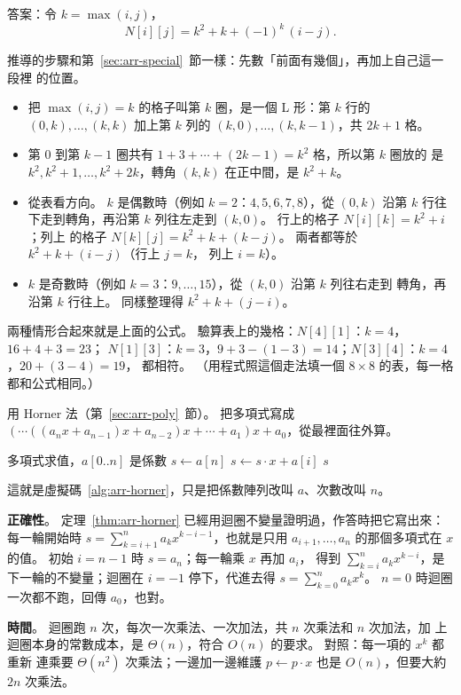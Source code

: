 答案：令 $k = \max(i, j)$，
\[
N[i][j] = k^2 + k + (-1)^k\,(i - j) .
\]

推導的步驟和第~\ref{sec:arr-special}~節一樣：先數「前面有幾個」，再加上自己這一段裡
的位置。
\begin{itemize}
\item 把 $\max(i, j) = k$ 的格子叫第 $k$ 圈，是一個 L 形：第 $k$ 行的
$(0,k), \ldots, (k,k)$ 加上第 $k$ 列的 $(k,0), \ldots, (k,k-1)$，共 $2k + 1$ 格。
\item 第 $0$ 到第 $k - 1$ 圈共有 $1 + 3 + \cdots + (2k - 1) = k^2$ 格，所以第 $k$ 圈放的
是 $k^2, k^2 + 1, \ldots, k^2 + 2k$，轉角 $(k, k)$ 在正中間，是 $k^2 + k$。
\item 從表看方向。 $k$ 是偶數時（例如 $k = 2$：$4, 5, 6, 7, 8$），從 $(0, k)$ 沿第 $k$
行往下走到轉角，再沿第 $k$ 列往左走到 $(k, 0)$。 行上的格子 $N[i][k] = k^2 + i$；列上
的格子 $N[k][j] = k^2 + k + (k - j)$。 兩者都等於 $k^2 + k + (i - j)$（行上 $j = k$，
列上 $i = k$）。
\item $k$ 是奇數時（例如 $k = 3$：$9, \ldots, 15$），從 $(k, 0)$ 沿第 $k$ 列往右走到
轉角，再沿第 $k$ 行往上。 同樣整理得 $k^2 + k + (j - i)$。
\end{itemize}
兩種情形合起來就是上面的公式。 驗算表上的幾格：$N[4][1]$：$k = 4$，$16 + 4 + 3 = 23$；
$N[1][3]$：$k = 3$，$9 + 3 - (1 - 3) = 14$；$N[3][4]$：$k = 4$，$20 + (3 - 4) = 19$，
都相符。 （用程式照這個走法填一個 $8 \times 8$ 的表，每一格都和公式相同。）

用 Horner 法（第~\ref{sec:arr-poly}~節）。 把多項式寫成
$(\cdots((a_n x + a_{n-1})x + a_{n-2})x + \cdots + a_1)x + a_0$，從最裡面往外算。
\begin{pseudo}[unbreakable]{多項式求值，$a[0..n]$ 是係數}
    \State $s \gets a[n]$
        \State $s \gets s \cdot x + a[i]$
    \EndFor
    \State \Return $s$
\EndFunction
\end{pseudo}
這就是虛擬碼~\ref{alg:arr-horner}，只是把係數陣列改叫 $a$、次數改叫 $n$。

\textbf{正確性}。 定理~\ref{thm:arr-horner} 已經用迴圈不變量證明過，作答時把它寫出來：
每一輪開始時 $s = \sum_{k=i+1}^{n} a_k x^{k-i-1}$，也就是只用 $a_{i+1}, \ldots, a_n$
的那個多項式在 $x$ 的值。 初始 $i = n - 1$ 時 $s = a_n$；每一輪乘 $x$ 再加 $a_i$，
得到 $\sum_{k=i}^{n} a_k x^{k-i}$，是下一輪的不變量；迴圈在 $i = -1$ 停下，代進去得
$s = \sum_{k=0}^{n} a_k x^{k}$。 $n = 0$ 時迴圈一次都不跑，回傳 $a_0$，也對。

\textbf{時間}。 迴圈跑 $n$ 次，每次一次乘法、一次加法，共 $n$ 次乘法和 $n$ 次加法，加
上迴圈本身的常數成本，是 $\Theta(n)$，符合 $O(n)$ 的要求。 對照：每一項的 $x^k$ 都重新
連乘要 $\Theta(n^2)$ 次乘法；一邊加一邊維護 $p \gets p \cdot x$ 也是 $O(n)$，但要大約
$2n$ 次乘法。
